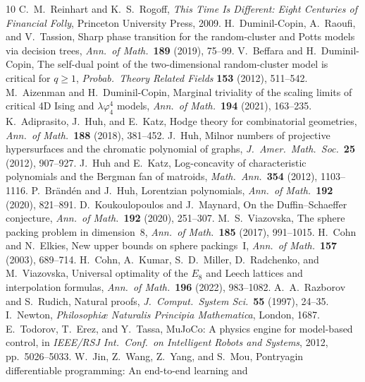 \documentclass[11pt, openany]{report}
\theoremstyle{plain}
\theoremstyle{definition}
\theoremstyle{remark}
\begin{document}
\begin{thebibliography}{10}
 C.~M.~Reinhart and K.~S.~Rogoff,
\emph{This Time Is Different: Eight Centuries of Financial Folly},
Princeton University Press, 2009.
H.~Duminil-Copin, A.~Raoufi, and V.~Tassion,
Sharp phase transition for the random-cluster and Potts models via
decision trees,
\emph{Ann.\ of Math.}\ \textbf{189} (2019), 75--99.
V.~Beffara and H.~Duminil-Copin,
The self-dual point of the two-dimensional random-cluster model is
critical for $q \geq 1$,
\emph{Probab.\ Theory Related Fields} \textbf{153} (2012), 511--542.
M.~Aizenman and H.~Duminil-Copin,
Marginal triviality of the scaling limits of critical 4D Ising and
$\lambda\varphi^4_4$ models,
\emph{Ann.\ of Math.}\ \textbf{194} (2021), 163--235.
K.~Adiprasito, J.~Huh, and E.~Katz,
Hodge theory for combinatorial geometries,
\emph{Ann.\ of Math.}\ \textbf{188} (2018), 381--452.
J.~Huh,
Milnor numbers of projective hypersurfaces and the chromatic polynomial
of graphs,
\emph{J.~Amer.\ Math.\ Soc.}\ \textbf{25} (2012), 907--927.
J.~Huh and E.~Katz,
Log-concavity of characteristic polynomials and the Bergman fan of
matroids,
\emph{Math.\ Ann.}\ \textbf{354} (2012), 1103--1116.
P.~Br\"and\'en and J.~Huh,
Lorentzian polynomials,
\emph{Ann.\ of Math.}\ \textbf{192} (2020), 821--891.
D.~Koukoulopoulos and J.~Maynard,
On the Duffin--Schaeffer conjecture,
\emph{Ann.\ of Math.}\ \textbf{192} (2020), 251--307.
M.~S.~Viazovska,
The sphere packing problem in dimension~8,
\emph{Ann.\ of Math.}\ \textbf{185} (2017), 991--1015.
H.~Cohn and N.~Elkies,
New upper bounds on sphere packings~I,
\emph{Ann.\ of Math.}\ \textbf{157} (2003), 689--714.
H.~Cohn, A.~Kumar, S.~D.~Miller, D.~Radchenko, and M.~Viazovska,
Universal optimality of the $E_8$ and Leech lattices and interpolation
formulas,
\emph{Ann.\ of Math.}\ \textbf{196} (2022), 983--1082.
A.~A.~Razborov and S.~Rudich,
Natural proofs,
\emph{J.~Comput.\ System Sci.}\ \textbf{55} (1997), 24--35.
I.~Newton,
\emph{Philosophi\ae{} Naturalis Principia Mathematica},
London, 1687.
E.~Todorov, T.~Erez, and Y.~Tassa,
MuJoCo: A physics engine for model-based control,
in \emph{IEEE/RSJ Int.\ Conf.\ on Intelligent Robots and Systems},
2012, pp.~5026--5033.
W.~Jin, Z.~Wang, Z.~Yang, and S.~Mou,
Pontryagin differentiable programming: An end-to-end learning and

\end{thebibliography}
\end{document}
